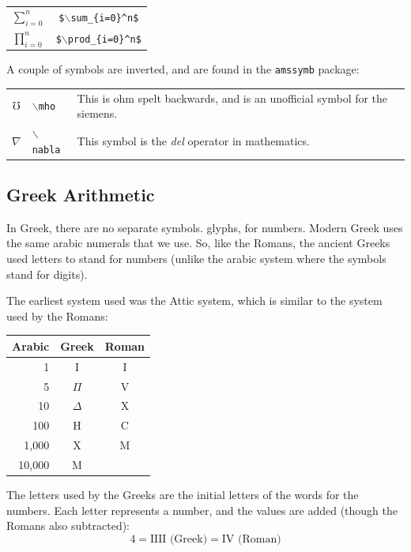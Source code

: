 \begin{tabular}{cc}
$\displaystyle \sum_{i=0}^{n}$  & \texttt{\$$\backslash$sum\_\{i=0\}\^{}n\$} \\
$\displaystyle \prod_{i=0}^{n}$ & \texttt{\$$\backslash$prod\_\{i=0\}\^{}n\$}
\end{tabular}

A couple of symbols are inverted, and are found in the \texttt{amssymb} package:

\begin{tabular}{clp{4.2cm}}
$\mho$   & \texttt{$\backslash$mho}   & This is ohm spelt backwards, and is an unofficial symbol for the siemens. \\
$\nabla$ & \texttt{$\backslash$nabla} & This symbol is the \textit{del} operator in mathematics.
\end{tabular}


\subsection{Greek Arithmetic}
In Greek, there are no separate symbols. glyphs, for numbers. Modern Greek uses the same arabic numerals that we use. So, like the Romans, the ancient Greeks used letters to stand for numbers (unlike the arabic system where the symbols stand for digits). 

The earliest system used was the Attic system, which is similar to the system used by the Romans:

\medskip

\begin{center}
\begin{tabular}{rcc}
\toprule
 Arabic & Greek & Roman \\
\midrule
 1     & I         & I \\
 5     & $\Pi$     & V \\
10     & $\Delta$  & X \\
100    & H         & C \\
1,000  & X         & M \\
10,000 & M         &   \\
\bottomrule
\end{tabular}
\end{center}

\medskip

The letters used by the Greeks are the initial letters of the words for the numbers. Each letter represents a number, and the values are added (though the Romans also subtracted):
\[
4 = \text{IIII (Greek)} = \text{IV (Roman)}
\]

